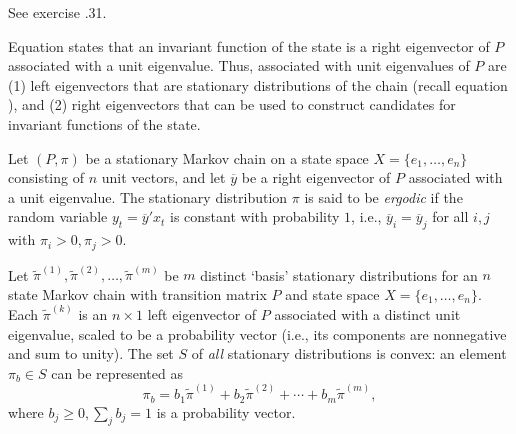 \endtheorem

\proof See exercise \the\chapternum.31.
\endproof





Equation 
  states that an invariant function of the state is
a right eigenvector of $P$ associated with a unit eigenvalue.
Thus, associated with unit eigenvalues of $P$ are (1) left eigenvectors that are stationary distributions of the chain (recall equation ),
and (2) right eigenvectors that can be used to construct  candidates for  invariant functions of the state. %


  Let $(P, \pi)$ be a stationary Markov chain on a  state space $X = \{e_1, \ldots, e_n\}$ consisting
of $n$ unit vectors, and let $\overline y$ be a right eigenvector of $P$ associated with a unit eigenvalue.
The stationary distribution $\pi$ is  said to be {\it ergodic\/} if the  random variable  $y_t = \overline y' x_t$
 is constant with probability $1$, i.e.,
$\overline y_i = \overline y_j$ for all $i, j$ with $\pi_i >0, \pi_j >0$.
\enddefinition

\medskip

  Let $\tilde \pi^{(1)}, \tilde \pi^{(2)}, \ldots, \tilde \pi^{(m)}$ be
$m$ distinct `basis' stationary distributions for an $n$ state Markov chain with transition matrix
$P$ and state space $X= \{e_1, \ldots, e_n\}$.  Each $\tilde \pi^{(k)}$ is an $n \times 1$  left eigenvector of $P$ associated with a distinct
unit eigenvalue, %
scaled to be a probability vector (i.e., its components are nonnegative and sum to unity).
The set $S$ of {\it all\/} stationary distributions is convex: an element $\pi_b \in S$   can  be represented
as
$$ \pi_b =   b_1 \tilde \pi^{(1)} + b_2 \tilde \pi^{(2)} +  \cdots + b_m \tilde \pi^{(m)} , $$
where $b_j \geq 0, \sum_j b_j =1$ is a probability vector.


